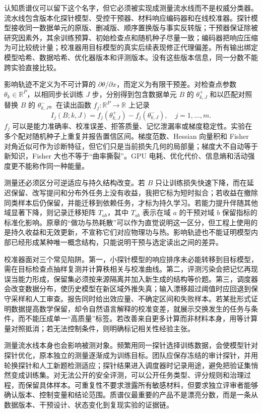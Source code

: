 认知质谱仪可以留下这个名字，但它必须被实现成测量流水线而不是权威分类器。流水线包含版本化探针模型、受控干预器、材料响应编码器和在线校准器。探针模型接收同一数据单元的原版、删减版、顺序置换版与事实反转版；干预器保证除被研究因素外，其余训练预算、初始检查点和随机种子尽量一致；编码器把响应压缩为可比较统计量；校准器用目标模型的真实后续表现修正代理偏差。所有输出绑定模型哈希、数据哈希、优化器版本和评测版本。没有这些版本信息，同一分数不能跨实验直接比较。

影响轨迹不定义为不可计算的 $\partial\theta/\partial x$，而定义为有限干预差。对检查点参数 $\theta_k\in\mathbb R^P$，以相同步长训练 $J$ 步，分别得到包含数据单元 $B$ 的 $\theta^{+}_{k,J}$ 和以匹配对照替换 $B$ 的 $\theta^{-}_{k,J}$。在读出函数 $f_j:\mathbb R^P\to\mathbb R$ 上记录
\begin{equation}
I_j(B;k,J)=f_j(\theta^{+}_{k,J})-f_j(\theta^{-}_{k,J}),\quad j=1,\ldots,m .
\end{equation}
$f_j$ 可以是能力准确率、校准误差、拒答质量、记忆泄漏率或梯度稳定性。实验在多个配对随机种子上重复并报告置信区间。梯度范数、Hessian 向量积和 Fisher 对角近似可作为诊断特征，但它们只是当前损失几何的局部量；梯度大不自动等于新知识，Fisher 大也不等于“曲率撕裂”。GPU 电耗、优化代价、信息熵和活动强度更不能称作同一种能量。

测量还必须区分可逆适应与持久结构改变。若 $B$ 只让训练损失快速下降，而在延迟保留、改写提问和分布外任务上没有收益，我把它标为短时拟合；若收益在撤除同类样本后仍保留，并能迁移到依赖任务，才标为持久学习。若能力提升伴随其他域显著下降，则记录迁移矩阵 $T_{ab}$，其中 $T_{ab}$ 表示在域 $a$ 的干预对域 $b$ 保留指标的标准化影响。原章的“做功与热耗散”可以作为直觉说明这一区分，但工程上使用的是持久收益和无效更新，不宣称它们对应物理功与热。影响轨迹也不能证明模型内部已经形成某种唯一概念结构，只能说明干预与选定读出之间的差异。

校准器面对三个常见陷阱。第一，小探针模型的响应排序未必能转移到目标模型，需在目标检查点抽样复测并计算秩相关与校准曲线。第二，评测污染会把记忆再现误当能力形成，保留集必须按来源隔离并加入新生成的结构等价题。第三，调度器会改变数据分布，使历史模型在新区域外推失真；输入漂移超过阈值时应回退到保守采样和人工审查。报告同时给出效应量、不确定区间和失败样本。若某批形式证明数据提高数学保留，却令自然语言解释的校准变差，就展示交换发生的任务与条件，而不能压成单一“高质量”标签。若改善来自更多计算而非材料本身，用等计算量对照抵消；若无法控制条件，则明确标记相关性经验主张。

测量流水线本身也会影响被测对象。频繁用同一探针选择训练数据，会使模型针对探针优化，原本独立的测量逐渐成为训练目标。团队应保存冻结的审计探针，并用轮换探针和人工新题检测适应；探针结果进入调度器时记录用途，避免把验证集悄然变成训练集。对无法公开的安全评测，可以公开任务类型、评分规则和治理过程，而保留具体样本。可重复性不要求泄露所有敏感材料，但要求独立评审者能够确认版本、控制变量和结论范围。质谱仪最重要的产品不是漂亮分数，而是一条从数据版本、干预设计、状态变化到复现实验的证据链。

